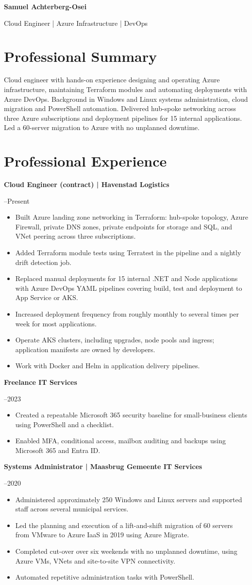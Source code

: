 \documentclass[11pt,a4paper]{article}
\newcommand{\cvsection}[1]{\section*{#1}}
\newcommand{\cvrole}[2]{\par\noindent\textbf{#1}\par\noindent #2\par}
\begin{document}
{\LARGE\bfseries\color{primarycolor} Samuel Achterberg-Osei}\par
{\large\color{accentcolor} Cloud Engineer | Azure Infrastructure | DevOps}

\cvsection{Professional Summary}
Cloud engineer with hands-on experience designing and operating Azure infrastructure, maintaining Terraform modules and automating deployments with Azure DevOps. Background in Windows and Linux systems administration, cloud migration and PowerShell automation. Delivered hub-spoke networking across three Azure subscriptions and deployment pipelines for 15 internal applications. Led a 60-server migration to Azure with no unplanned downtime.

\cvsection{Professional Experience}
\cvrole{Cloud Engineer (contract) | Havenstad Logistics}{2025–Present}
\begin{itemize}
\item Built Azure landing zone networking in Terraform: hub-spoke topology, Azure Firewall, private DNS zones, private endpoints for storage and SQL, and VNet peering across three subscriptions.
\item Added Terraform module tests using Terratest in the pipeline and a nightly drift detection job.
\item Replaced manual deployments for 15 internal .NET and Node applications with Azure DevOps YAML pipelines covering build, test and deployment to App Service or AKS.
\item Increased deployment frequency from roughly monthly to several times per week for most applications.
\item Operate AKS clusters, including upgrades, node pools and ingress; application manifests are owned by developers.
\item Work with Docker and Helm in application delivery pipelines.
\end{itemize}

\cvrole{Freelance IT Services}{2022–2023}
\begin{itemize}
\item Created a repeatable Microsoft 365 security baseline for small-business clients using PowerShell and a checklist.
\item Enabled MFA, conditional access, mailbox auditing and backups using Microsoft 365 and Entra ID.
\end{itemize}

\cvrole{Systems Administrator | Maasbrug Gemeente IT Services}{2014–2020}
\begin{itemize}
\item Administered approximately 250 Windows and Linux servers and supported staff across several municipal services.
\item Led the planning and execution of a lift-and-shift migration of 60 servers from VMware to Azure IaaS in 2019 using Azure Migrate.
\item Completed cut-over over six weekends with no unplanned downtime, using Azure VMs, VNets and site-to-site VPN connectivity.
\item Automated repetitive administration tasks with PowerShell.
\end{itemize}
\end{document}
